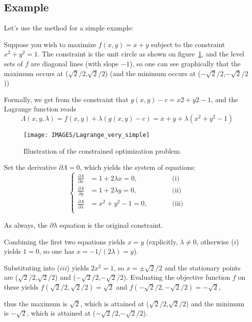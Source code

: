 \subsection{Example}

Let's use the method for a simple example:

Suppose you wish to maximize $f(x,y) = x + y$ subject to the constraint $x^2 + y^2 = 1$. The constraint is the unit circle as shown on figure~\ref{fig:exSimple}, and the level sets of $f$ are diagonal lines (with slope $-1$), so one can see graphically that the maximum occurs at ($\sqrt{2}/2$,$\sqrt{2}/2$) (and the minimum occurs at ($-\sqrt{2}/2$,$-\sqrt{2}/2$))

Formally, we get from the constraint that $g(x,y)-c = x2+y2-1$, and the Lagrange function reads
\begin{equation}
    \Lambda(x,y,\lambda) = f(x,y)+\lambda(g(x,y)-c) = x+y+\lambda(x^2+y^2-1)
\end{equation} 



\begin{figure}
 \centering
 \texttt{[image: IMAGES/Lagrange\_very\_simple]}
 \caption{Illustration of the constrained optimization problem.}
 \label{fig:exSimple}
\end{figure}
Set the derivative $\partial \Lambda = 0$, which yields the system of equations:
\begin{equation}
  \left\{
      \begin{aligned}
	\frac{\partial \Lambda}{\partial x} &= 1 + 2 \lambda x = 0, \qquad &&\text{(i)} \\
	\frac{\partial \Lambda}{\partial y} &= 1 + 2 \lambda y = 0, \qquad &&\text{(ii)} \\
	\frac{\partial \Lambda}{\partial \lambda} &= x^2 + y^2-1 = 0, \qquad &&\text{(iii)} \\
      \end{aligned}
    \right.
\end{equation}


As always, the $\partial \lambda$ equation is the original constraint.

Combining the first two equations yields $x = y$ (explicitly, $\lambda \neq 0$, otherwise ($i$) yields $1 = 0$, so one has $x = -1 / (2\lambda) = y$).

Substituting into ($iii$) yields $2x^2 = 1$, so $x=\pm \sqrt{2}/2$ and the stationary points are ($\sqrt{2}/2$,$\sqrt{2}/2$) and ($-\sqrt{2}/2$,$-\sqrt{2}/2$).
Evaluating the objective function $f$ on these yields  $f(\sqrt{2}/2,\sqrt{2}/2)=\sqrt{2}$  and $f(-\sqrt{2}/2, -\sqrt{2}/2)=-\sqrt{2}$,

thus the maximum is $\sqrt{2}$, which is attained at ($\sqrt{2}/2$,$\sqrt{2}/2$) and the minimum is $-\sqrt{2}$, which is attained at ($-\sqrt{2}/2$,$-\sqrt{2}/2$).
